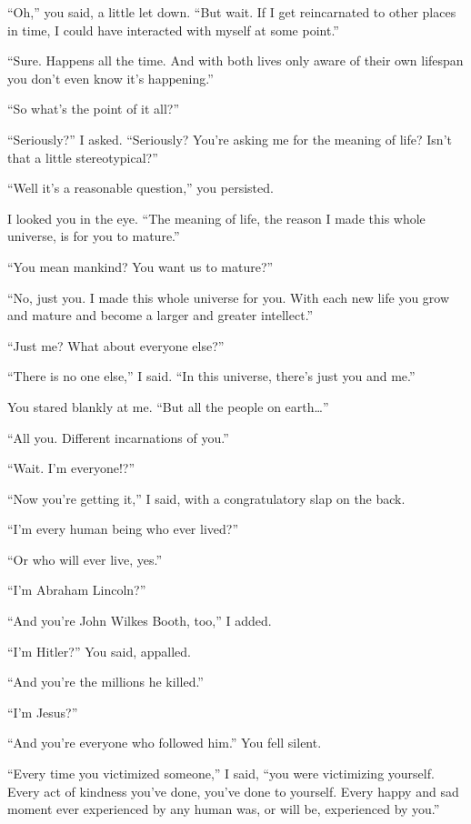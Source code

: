 \enquote{Oh,} you said, a little let down. \enquote{But wait. If I get reincarnated to other places in time, I could have interacted with myself at some point.}

\enquote{Sure. Happens all the time. And with both lives only aware of their own lifespan you don't even know it's happening.}

\enquote{So what's the point of it all?}

\enquote{Seriously?} I asked. \enquote{Seriously? You're asking me for the meaning of life? Isn't that a little stereotypical?}

\enquote{Well it's a reasonable question,} you persisted.

I looked you in the eye. \enquote{The meaning of life, the reason I made this whole universe, is for you to mature.}

\enquote{You mean mankind? You want us to mature?}

\enquote{No, just you. I made this whole universe for you. With each new life you grow and mature and become a larger and greater intellect.}

\enquote{Just me? What about everyone else?}

\enquote{There is no one else,} I said. \enquote{In this universe, there's just you and me.}

You stared blankly at me. \enquote{But all the people on earth\ldots{}}

\enquote{All you. Different incarnations of you.}

\enquote{Wait. I'm everyone!?}

\enquote{Now you're getting it,} I said, with a congratulatory slap on the back.

\enquote{I'm every human being who ever lived?}

\enquote{Or who will ever live, yes.}

\enquote{I'm Abraham Lincoln?}

\enquote{And you're John Wilkes Booth, too,} I added.

\enquote{I'm Hitler?} You said, appalled.

\enquote{And you're the millions he killed.}

\enquote{I'm Jesus?}

\enquote{And you're everyone who followed him.}
You fell silent.

\enquote{Every time you victimized someone,} I said, \enquote{you were victimizing yourself. Every act of kindness you've done, you've done to yourself. Every happy and sad moment ever experienced by any human was, or will be, experienced by you.}

